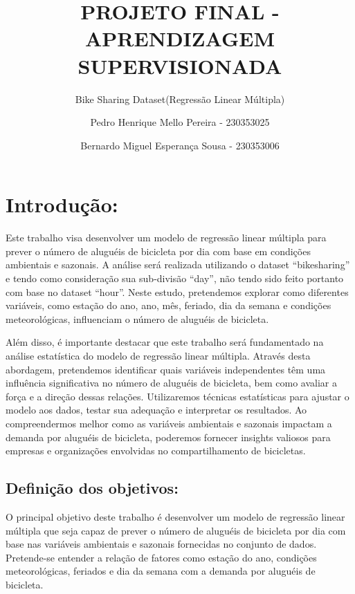 \documentclass[
  letterpaper,
  DIV=11,
  numbers=noendperiod]{scrartcl}
\title{PROJETO FINAL - APRENDIZAGEM SUPERVISIONADA}
\subtitle{Bike Sharing Dataset(Regressão Linear Múltipla)}
\author{Pedro Henrique Mello Pereira - 230353025 \and Bernardo Miguel
Esperança Sousa - 230353006}
\date{}
\renewcommand*\contentsname{Table of contents}
\newcommand\contentsname{Table of contents}
\begin{document}
\maketitle

\renewcommand*\contentsname{Table of contents}
{
\hypersetup{linkcolor=}
\setcounter{tocdepth}{3}
\tableofcontents
}
\newpage{}

\section{Introdução:}\label{introduuxe7uxe3o}

Este trabalho visa desenvolver um modelo de regressão linear múltipla
para prever o número de aluguéis de bicicleta por dia com base em
condições ambientais e sazonais. A análise será realizada utilizando o
dataset ``bikesharing'' e tendo como consideração sua sub-divisão
``day'', não tendo sido feito portanto com base no dataset ``hour''.
Neste estudo, pretendemos explorar como diferentes variáveis, como
estação do ano, ano, mês, feriado, dia da semana e condições
meteorológicas, influenciam o número de aluguéis de bicicleta.

Além disso, é importante destacar que este trabalho será fundamentado na
análise estatística do modelo de regressão linear múltipla. Através
desta abordagem, pretendemos identificar quais variáveis independentes
têm uma influência significativa no número de aluguéis de bicicleta, bem
como avaliar a força e a direção dessas relações. Utilizaremos técnicas
estatísticas para ajustar o modelo aos dados, testar sua adequação e
interpretar os resultados. Ao compreendermos melhor como as variáveis
ambientais e sazonais impactam a demanda por aluguéis de bicicleta,
poderemos fornecer insights valiosos para empresas e organizações
envolvidas no compartilhamento de bicicletas.

\subsection{Definição dos
objetivos:}\label{definiuxe7uxe3o-dos-objetivos}

O principal objetivo deste trabalho é desenvolver um modelo de regressão
linear múltipla que seja capaz de prever o número de aluguéis de
bicicleta por dia com base nas variáveis ambientais e sazonais
fornecidas no conjunto de dados. Pretende-se entender a relação de
fatores como estação do ano, condições meteorológicas, feriados e dia da
semana com a demanda por aluguéis de bicicleta.
\end{document}
